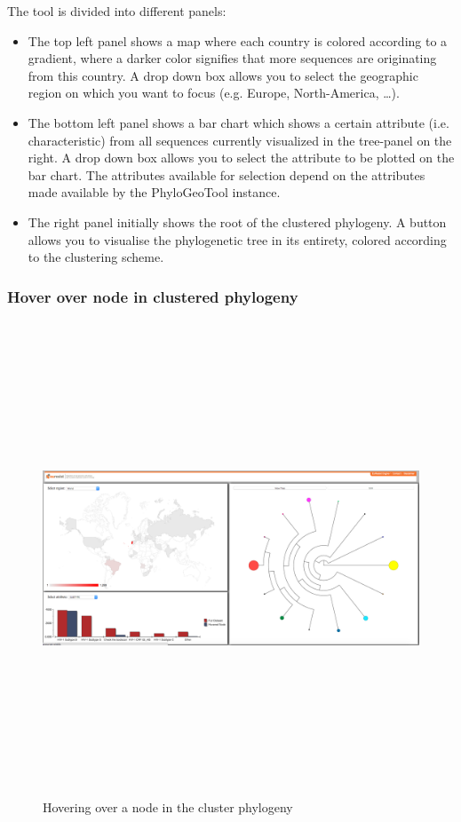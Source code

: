 \documentclass[a4paper, 11pt]{article} %
\begin{document}
The tool is divided into different panels: 
\begin{itemize}
  \item The top left panel shows a map where each country is colored according to a gradient, where a darker color signifies that more sequences are originating from this country. A drop down box allows you to select the geographic region on which you want to focus (e.g. Europe, North-America, \ldots).
  \item The bottom left panel shows a bar chart which shows a certain attribute (i.e. characteristic) from all sequences currently visualized in the tree-panel on the right. A drop down box allows you to select the attribute to be plotted on the bar chart. The attributes available for selection depend on the attributes made available by the PhyloGeoTool instance.
  \item The right panel initially shows the root of the clustered phylogeny. A button allows you to visualise the phylogenetic tree in its entirety, colored according to the clustering scheme.
\end{itemize}

\subsubsection{Hover over node in clustered phylogeny}
\begin{figure}[H]
\centering
\includegraphics[width=400pt, height=400pt, keepaspectratio=true]{images/hover_node.PNG}
\caption{Hovering over a node in the cluster phylogeny}
\label{fig:hover_node}
\end{figure}
\end{document}
